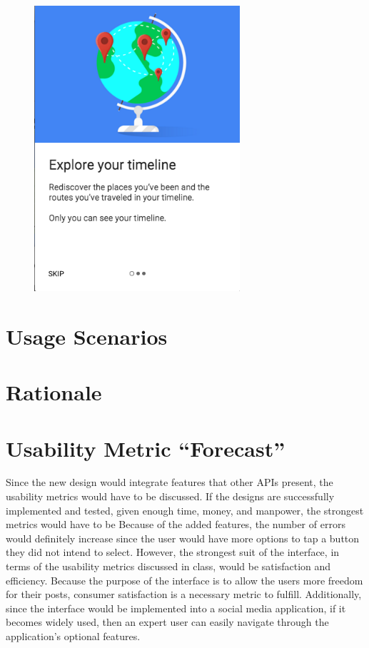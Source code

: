 \documentclass[11pt]{article}
\begin{document}
\begin{figure}[ht]
\centering
\includegraphics[width=3in]{images/view_your_timeline_prompt.png}
\label{google_tracking}
\end{figure}

\section{Usage Scenarios}

\section{Rationale}

\section{Usability Metric ``Forecast''}
Since the new design would integrate features that other APIs present, the usability metrics would have to be discussed. If the designs are successfully implemented and tested, given enough time, money, and manpower, the strongest metrics would have to be 
\indent Because of the added features, the number of errors would definitely increase since the user would have more options to tap a button they did not intend to select. 
\indent However, the strongest suit of the interface, in terms of the usability metrics discussed in class, would be satisfaction and efficiency. Because the purpose of the interface is to allow the users more freedom for their posts, consumer satisfaction is a necessary metric to fulfill. Additionally, since the interface would be implemented into a social media application, if it becomes widely used, then an expert user can easily navigate through the application's optional features.

\clearpage


\end{document}
